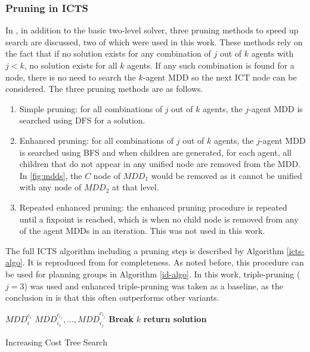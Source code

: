 \documentclass[english]{article}
\begin{document}
	\subsubsection{Pruning in ICTS}
	\label{pruning}
	In \cite{sharon2011}, in addition to the basic two-level solver, three pruning methods to speed up search are discussed, two of which were used in this work. These methods rely on the fact that if no solution exists for any combination of $j$ out of $k$ agents with $j < k$, no solution exists for all $k$ agents. If any such combination is found for a node, there is no need to search the $k$-agent MDD so the next ICT node can be considered. The three pruning methods are as follows.
	\begin{enumerate}
		\item Simple pruning: for all combinations of $j$ out of $k$ agents, the $j$-agent MDD is searched using DFS for a solution.
		\item Enhanced pruning: for all combinations of $j$ out of $k$ agents, the $j$-agent MDD is searched using BFS and when children are generated, for each agent, all children that do not appear in any unified node are removed from the MDD. In \ref{fig:mdds}, the $C$ node of $MDD_1$ would be removed as it cannot be unified with any node of $MDD_2$ at that level.
		\item Repeated enhanced pruning: the enhanced pruning procedure is repeated until a fixpoint is reached, which is when no child node is removed from any of the agent MDDs in an iteration. This was not used in this work. 
	\end{enumerate}
	The full ICTS algorithm including a pruning step is described by Algorithm \ref{icts-algo}. It is reproduced from \cite{sharon2011} for completeness. As noted before, this procedure can be used for planning groups in Algorithm \ref{id-algo}. In this work, triple-pruning ($j=3$) was used and enhanced triple-pruning was taken as a baseline, as the conclusion in \cite{sharon2011} is that this often outperforms other variants.
	\begin{algorithm}
		\begin{algorithmic}[1]
			\State {}
			 $MDD_i^{c_i}$
			\EndFor
			\State {}$MDD_{i_1}^{c_{i_1}},\ldots,MDD_{i_j}^{c_{i_j}}$
			\State \textbf{Break}
			\EndIf
			\EndFor
			\State {}$k$
			\State \textbf{return solution}
			\EndIf
			\EndFor
			
			\EndProcedure
		\end{algorithmic}
		\caption{Increasing Cost Tree Search}
		\label{icts-algo}
	\end{algorithm}
\end{document}
